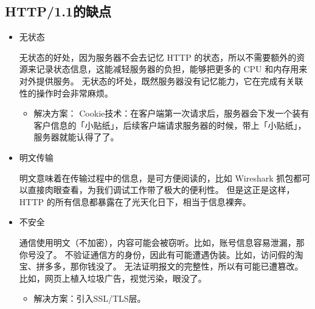 \documentclass[11pt]{article}
\begin{document}
\subsection{HTTP/1.1的缺点}
\label{sec:org9d2cec2}
\begin{itemize}
\item 无状态

无状态的好处，因为服务器不会去记忆 HTTP 的状态，所以不需要额外的资源来记录状态信息，这能减轻服务器的负担，能够把更多的 CPU 和内存用来对外提供服务。
无状态的坏处，既然服务器没有记忆能力，它在完成有关联性的操作时会非常麻烦。
\begin{itemize}
\item 解决方案：
Cookie技术：在客户端第一次请求后，服务器会下发一个装有客户信息的「小贴纸」，后续客户端请求服务器的时候，带上「小贴纸」，服务器就能认得了了。
\end{itemize}
\item 明文传输

明文意味着在传输过程中的信息，是可方便阅读的，比如 Wireshark 抓包都可以直接肉眼查看，为我们调试工作带了极大的便利性。
但是这正是这样，HTTP 的所有信息都暴露在了光天化日下，相当于信息裸奔。
\item 不安全

通信使用明文（不加密），内容可能会被窃听。比如，账号信息容易泄漏，那你号没了。
不验证通信方的身份，因此有可能遭遇伪装。比如，访问假的淘宝、拼多多，那你钱没了。
无法证明报文的完整性，所以有可能已遭篡改。比如，网页上植入垃圾广告，视觉污染，眼没了。
\begin{itemize}
\item 解决方案：引入SSL/TLS层。
\end{itemize}
\end{itemize}
\end{document}
